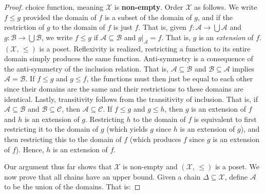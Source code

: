 \documentclass{article}
\theoremstyle{definition}
\begin{document}
\begin{proof}
                choice function, meaning $\mathcal{X}$ is \textbf{non-empty}.
                Order $\mathcal{X}$ as follows. We write
                $f\leq{g}$ provided the domain of $f$ is a subset of the domain
                of $g$, and if the restriction of $g$ to the domain of $f$ is
                just $f$. That is, given
                $f:\mathcal{A}\rightarrow\bigcup\mathcal{A}$
                and
                $g:\mathcal{B}%
                    \rightarrow\bigcup\mathcal{B}$,
                we write $f\leq{g}$ if
                $\mathcal{A}\subseteq\mathcal{B}$ and
                $g|_{\mathcal{A}}=f$. That is, $g$ is an
                \textit{extension} of $f$. $(\mathcal{X},\,\leq)$ is a poset.
                Reflexivity is realized, restricting a function to its entire
                domain simply produces the same function. Anti-symmetry is
                a consequence of the anti-symmetry of the inclusion relation.
                That is,
                $\mathcal{A}\subseteq\mathcal{B}$
                and
                $\mathcal{B}\subseteq\mathcal{A}$
                implies
                $\mathcal{A}=\mathcal{B}$. If
                $f\leq{g}$ and $g\leq{f}$, the functions must then just be
                equal to each other since their domains are the same and their
                restrictions to these domains are identical. Lastly,
                transitivity follows from the transitivity of inclusion.
                That is, if
                $\mathcal{A}\subseteq\mathcal{B}$
                and
                $\mathcal{B}%
                    \subseteq\mathcal{C}$,
                then
                $\mathcal{A}\subseteq\mathcal{C}$.
                If $f\leq{g}$ and $g\leq{h}$, then $g$ is an extension of
                $f$ and $h$ is an extension of $g$. Restricting
                $h$ to the domain of $f$ is equivalent to first restricting
                it to the domain of $g$ (which yields $g$ since $h$ is an
                extension of $g$), and then restricting this to the domain of
                $f$ (which produces $f$ since $g$ is an extension of $f$).
                Hence, $h$ is an extension of $f$.
                \par\hfill\par
                Our argument thus far shows that $\mathcal{X}$ is non-empty
                and $(\mathcal{X},\,\leq)$ is a poset. We now prove that
                all chains have an upper bound. Given a chain
                $\Delta\subseteq\mathcal{X}$, define
                $\mathcal{A}$ to be the union of the domains. That is:

\end{proof}
\end{document}
